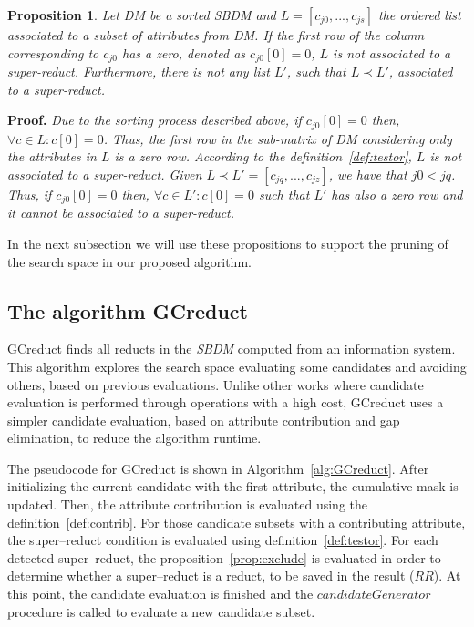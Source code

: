 \documentclass[number,preprint,review,12pt]{elsarticle}
\newtheorem{proposition}{Proposition}
\begin{document}
	\begin{proposition}\label{prop:firstRow}
		Let DM be a sorted SBDM and $L = [c_{j0},...,c_{js}]$ the ordered list associated to a subset of attributes from DM. If the first row of the column corresponding to $c_{j0}$ has a zero, denoted as $c_{j0}[0]=0$, $L$ is not associated to a super-reduct. Furthermore, there is not any list $L'$, such that $L\prec L'$, associated to a super-reduct.
	\end{proposition}
	
	\noindent
	\textbf{Proof.} \textit{Due to the sorting process described above, if $c_{j0}[0]=0$ then, $\forall c \in L: c[0]=0$. Thus, the first row in the sub-matrix of DM considering only the attributes in $L$ is a zero row. According to the definition~\ref{def:testor}, $L$ is not associated to a super-reduct. Given $L \prec L'= [c_{jq},...,c_{jz}]$, we have that $j0<jq$. Thus, if $c_{j0}[0]=0$ then, $\forall c \in L': c[0]=0$ such that $L'$ has also a zero row and it cannot be associated to a super-reduct.}

	
	In the next subsection we will use these propositions to support the pruning of the search space in our proposed algorithm.

\subsection{The algorithm GCreduct}\label{description}
	GCreduct finds all reducts in the \textit{SBDM} computed from an information system. This algorithm explores the search space evaluating some candidates and avoiding others, based on previous evaluations. Unlike other works \citep{WangP07,Lias13} where candidate evaluation is performed through operations with a high cost, GCreduct uses a simpler candidate evaluation, based on attribute contribution and gap elimination, to reduce the algorithm runtime. 
	
	The pseudocode for GCreduct is shown in Algorithm~\ref{alg:GCreduct}. After initializing the current candidate with the first attribute, the cumulative mask is updated. Then, the attribute contribution is evaluated using the definition~\ref{def:contrib}. For those candidate subsets with a contributing attribute, the super--reduct condition is evaluated using definition~\ref{def:testor}. For each detected super--reduct, the proposition~\ref{prop:exclude} is evaluated in order to determine whether a super--reduct is a reduct, to be saved in the result ($RR$). At this point, the candidate evaluation is finished and the $candidateGenerator$ procedure is called to evaluate a new candidate subset.
	
\end{document}
